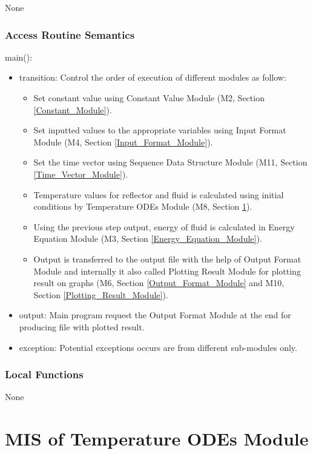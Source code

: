 \documentclass[12pt, titlepage]{article}
\begin{document}
None

\subsubsection{Access Routine Semantics}

\noindent main():
\begin{itemize}
\item transition: Control the order of execution of different modules as follow: \\
\begin{itemize}
    \item Set constant value using Constant Value Module (M2, Section \ref{Constant_Module}). 
    \item Set inputted values to the appropriate variables using Input Format Module (M4, Section \ref{Input_Format_Module}). 
    \item Set the time vector using Sequence Data Structure Module (M11, Section \ref{Time_Vector_Module}).
    \item Temperature values for reflector and fluid is calculated using initial conditions by Temperature ODEs Module (M8, Section \ref{Temperature_ODEs_Module}). 
    \item Using the previous step output, energy of fluid is calculated in Energy Equation Module (M3, Section \ref{Energy_Equation_Module}).
    \item Output is transferred to the output file with the help of Output Format Module and internally it also called Plotting Result Module for plotting result on graphs (M6, Section \ref{Output_Format_Module} and M10, Section \ref{Plotting_Result_Module}). 
     
\end{itemize}
\item output: Main program request the Output Format Module at the end for producing file with plotted result. 
\item exception: Potential exceptions occurs are from different sub-modules only.   
\end{itemize}


\subsubsection{Local Functions}

None



\section{MIS of Temperature ODEs Module} \label{Temperature_ODEs_Module} 
\end{document}
